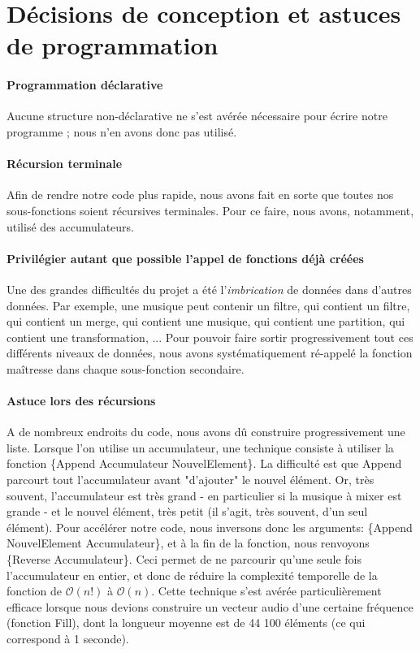 \documentclass[10pt,a4paper]{article}
\begin{document}
\section{Décisions de conception et astuces de programmation}
\paragraph{Programmation déclarative} 
Aucune structure non-déclarative ne s'est avérée nécessaire
pour écrire notre programme ; nous n'en avons donc pas utilisé.

\paragraph{Récursion terminale} 
Afin de rendre notre code plus rapide, nous avons fait en 
sorte que toutes nos sous-fonctions soient récursives terminales. 
Pour ce faire, nous avons, notamment, utilisé des accumulateurs.
 
\paragraph{Privilégier autant que possible l'appel de fonctions déjà créées} 
Une des grandes difficultés du projet a été l'\textit{imbrication} de données dans d'autres données. 
Par exemple, une musique peut contenir un filtre, qui contient un filtre,
qui contient un merge, qui contient une musique, qui contient une partition, qui contient une transformation, ... 
Pour pouvoir faire sortir progressivement tout ces différents niveaux de données, nous avons systématiquement ré-appelé
la fonction maîtresse dans chaque sous-fonction secondaire.

\paragraph{Astuce lors des récursions}
A de nombreux endroits du code, nous avons dû construire progressivement une liste. 
Lorsque l'on utilise un accumulateur, une technique  consiste à utiliser la fonction 
\{Append Accumulateur NouvelElement\}. La difficulté est que Append  parcourt tout 
l'accumulateur avant "d'ajouter" le nouvel élément. Or, très souvent, l'accumulateur 
est très grand - en particulier si la musique à mixer est grande - et le nouvel élément,
très petit (il s'agit, très souvent, d'un seul élément). Pour accélérer notre code, 
nous inversons donc les arguments: \{Append NouvelElement Accumulateur\}, et à la fin 
de la fonction, nous renvoyons \{Reverse Accumulateur\}. Ceci permet de ne parcourir 
qu'une seule fois l'accumulateur en entier, et donc de réduire la complexité temporelle
de la fonction de $\mathcal{O}(n!)$ à $\mathcal{O}(n)$. Cette technique s'est avérée particulièrement efficace
lorsque nous devions construire un vecteur audio d'une certaine fréquence (fonction Fill),
dont la longueur moyenne est de 44 100 éléments (ce qui correspond à 1 seconde).
\end{document}
